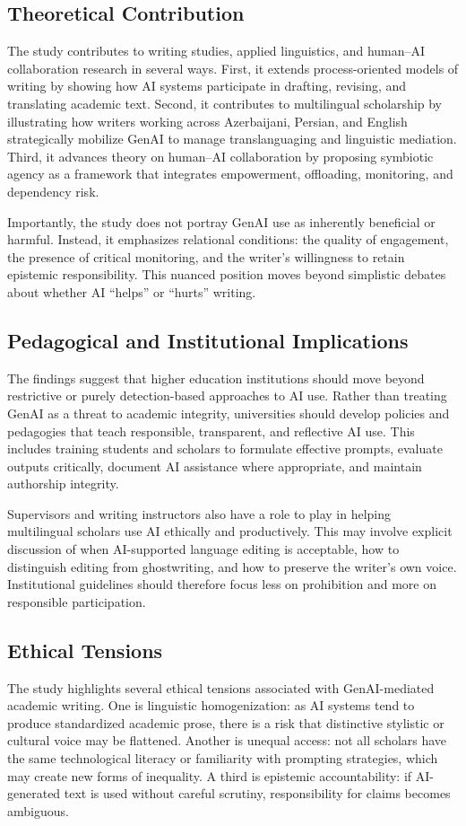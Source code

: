 \documentclass[12pt]{article}
\begin{document}
\subsection{Theoretical Contribution}
The study contributes to writing studies, applied linguistics, and human--AI collaboration research in several ways. First, it extends process-oriented models of writing by showing how AI systems participate in drafting, revising, and translating academic text. Second, it contributes to multilingual scholarship by illustrating how writers working across Azerbaijani, Persian, and English strategically mobilize GenAI to manage translanguaging and linguistic mediation. Third, it advances theory on human--AI collaboration by proposing symbiotic agency as a framework that integrates empowerment, offloading, monitoring, and dependency risk.

Importantly, the study does not portray GenAI use as inherently beneficial or harmful. Instead, it emphasizes relational conditions: the quality of engagement, the presence of critical monitoring, and the writer's willingness to retain epistemic responsibility. This nuanced position moves beyond simplistic debates about whether AI ``helps'' or ``hurts'' writing.

\subsection{Pedagogical and Institutional Implications}
The findings suggest that higher education institutions should move beyond restrictive or purely detection-based approaches to AI use. Rather than treating GenAI as a threat to academic integrity, universities should develop policies and pedagogies that teach responsible, transparent, and reflective AI use. This includes training students and scholars to formulate effective prompts, evaluate outputs critically, document AI assistance where appropriate, and maintain authorship integrity.

Supervisors and writing instructors also have a role to play in helping multilingual scholars use AI ethically and productively. This may involve explicit discussion of when AI-supported language editing is acceptable, how to distinguish editing from ghostwriting, and how to preserve the writer's own voice. Institutional guidelines should therefore focus less on prohibition and more on responsible participation.

\subsection{Ethical Tensions}
The study highlights several ethical tensions associated with GenAI-mediated academic writing. One is linguistic homogenization: as AI systems tend to produce standardized academic prose, there is a risk that distinctive stylistic or cultural voice may be flattened. Another is unequal access: not all scholars have the same technological literacy or familiarity with prompting strategies, which may create new forms of inequality. A third is epistemic accountability: if AI-generated text is used without careful scrutiny, responsibility for claims becomes ambiguous.
\end{document}
